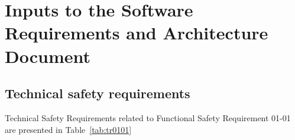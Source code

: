 \chapter{Inputs to the Software Requirements and Architecture Document}
\label{ch:inputs}

 
 


\section{Technical safety requirements}

Technical Safety Requirements related to Functional Safety Requirement 01-01 are
presented in Table~\ref{tab:tr0101}

